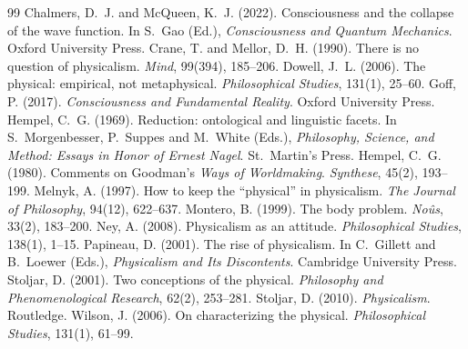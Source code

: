 \documentclass{situationist-preprint}
\begin{document}
\begin{thebibliography}{99}\small
{} Chalmers, D.~J. and McQueen, K.~J. (2022). Consciousness and the collapse of the wave function. In S.~Gao (Ed.), \emph{Consciousness and Quantum Mechanics}. Oxford University Press.
 Crane, T. and Mellor, D.~H. (1990). There is no question of physicalism. \emph{Mind}, 99(394), 185--206.
 Dowell, J.~L. (2006). The physical: empirical, not metaphysical. \emph{Philosophical Studies}, 131(1), 25--60.
 Goff, P. (2017). \emph{Consciousness and Fundamental Reality}. Oxford University Press.
 Hempel, C.~G. (1969). Reduction: ontological and linguistic facets. In S.~Morgenbesser, P.~Suppes and M.~White (Eds.), \emph{Philosophy, Science, and Method: Essays in Honor of Ernest Nagel}. St.~Martin's Press.
 Hempel, C.~G. (1980). Comments on Goodman's \emph{Ways of Worldmaking}. \emph{Synthese}, 45(2), 193--199.
 Melnyk, A. (1997). How to keep the \enquote{physical} in physicalism. \emph{The Journal of Philosophy}, 94(12), 622--637.
 Montero, B. (1999). The body problem. \emph{No\^us}, 33(2), 183--200.
 Ney, A. (2008). Physicalism as an attitude. \emph{Philosophical Studies}, 138(1), 1--15.
 Papineau, D. (2001). The rise of physicalism. In C.~Gillett and B.~Loewer (Eds.), \emph{Physicalism and Its Discontents}. Cambridge University Press.
 Stoljar, D. (2001). Two conceptions of the physical. \emph{Philosophy and Phenomenological Research}, 62(2), 253--281.
 Stoljar, D. (2010). \emph{Physicalism}. Routledge.
 Wilson, J. (2006). On characterizing the physical. \emph{Philosophical Studies}, 131(1), 61--99.
\end{thebibliography}
\end{document}
